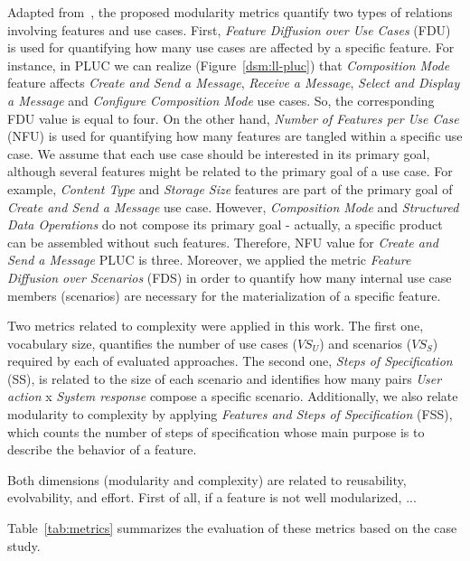\documentclass{acm_proc_article-sp}
\begin{document}
Adapted from~\cite{greenwood-ecoop-2007}, the proposed modularity metrics quantify two types of 
relations involving features and use cases. First, \emph{Feature Diffusion over Use Cases} (FDU)
is used for quantifying how many use cases are affected by a specific feature. For instance, in PLUC we 
can realize (Figure~\ref{dsm:ll-pluc}) that \emph{Composition Mode} feature affects \emph{Create and Send a Message}, 
\emph{Receive a Message}, \emph{Select and Display a Message} and \emph{Configure Composition Mode} use cases. So, the 
corresponding FDU value is equal to four. On the other hand, \emph{Number of Features per Use Case} (NFU)
is used for quantifying how many features are tangled within a specific use case. We assume that each use 
case should be interested in its primary goal, although several features might be related to the primary goal of a use case.
For example, \emph{Content Type} and \emph{Storage Size} features are part of the primary goal of \emph{Create and Send a
Message} use case. However, \emph{Composition Mode} and \emph{Structured Data Operations} do not compose
its primary goal - actually, a specific product can be assembled without such features. 
Therefore, NFU value for \emph{Create and Send a Message} PLUC is three. Moreover, 
we applied the metric \emph{Feature Diffusion over Scenarios} (FDS) in order 
to quantify how many internal use case members (scenarios) are necessary for the materialization of a specific feature.

Two metrics related to complexity were applied in this work. The first one, vocabulary size,
quantifies the number of use cases ($VS_{U}$) and scenarios ($VS_{S}$) required by each of evaluated
approaches. The second one, \emph{Steps of Specification} (SS), is related to the size of each 
scenario and identifies how many pairs \emph{User action} x \emph{System response} compose a specific scenario. 
Additionally, we also relate modularity to complexity by applying \emph{Features and Steps of Specification} (FSS), which counts the number of steps of specification whose main purpose is to describe the behavior of a feature. 

Both dimensions (modularity and complexity) are related to reusability, evolvability, and effort. First of all, if a feature is not well modularized, ...

Table~\ref{tab:metrics} summarizes the evaluation of these metrics based on the case study.
\end{document}

